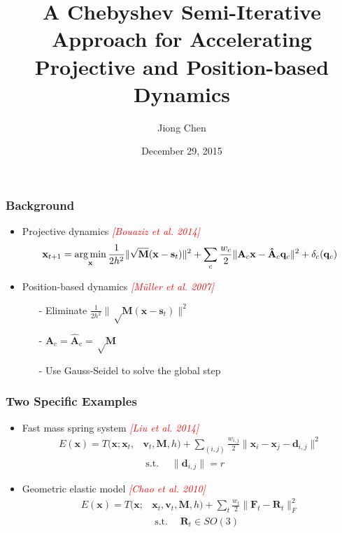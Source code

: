\documentclass[serif,mathserif]{beamer}
\author[Jiong Chen]{Jiong Chen}
\title[\hspace{2em}\insertframenumber/\inserttotalframenumber]{\huge A Chebyshev Semi-Iterative Approach for Accelerating Projective and Position-based Dynamics}
\date{December 29, 2015} %
\newcommand{\BOLD}[1]{\mathbf{#1}}
\newcommand{\TODO}[1]{\textcolor{red}{#1}}
\newcommand{\argmin}{\operatornamewithlimits{arg\min}}
\DeclareMathOperator{\ST}{s.t.}
\begin{document}
\maketitle

\begin{frame}
 \frametitle{Background}
 \begin{itemize}
  \item Projective dynamics \TODO{\textit{[Bouaziz et al. 2014]}}
  \begin{equation*}
    \BOLD{x}_{t+1}=\argmin_{\BOLD{x}} \frac{1}{2h^2}\|\sqrt\BOLD{M}(\BOLD{x}-\BOLD{s}_t)\|^2+\sum_c\frac{w_c}{2}\|\BOLD{A}_c\BOLD{x}-\BOLD{\hat A}_c\BOLD{q}_c\|^2+\delta_c(\BOLD{q}_c)
  \end{equation*}
  \item Position-based dynamics \TODO{\textit{[M\"uller et al. 2007]}}
    \begin{itemize}
     \item[-] Eliminate $\frac{1}{2h^2}\|\sqrt\BOLD{M}(\BOLD{x}-\BOLD{s}_t)\|^2$
     \item[-] $\BOLD{A}_c = \BOLD{\hat A}_c = \sqrt \BOLD{M}$
     \item[-] Use Gauss-Seidel to solve the global step
    \end{itemize}
 \end{itemize}
\end{frame}

\begin{frame}
 \frametitle{Two Specific Examples}
 \begin{itemize}
  \item Fast mass spring system \TODO{\textit{[Liu et al. 2014]}}
  \begin{equation*}
   \begin{split}
    E(\BOLD{x})=T(\BOLD{x}; \BOLD{x}_t, &\BOLD{v}_t, \BOLD{M}, h)+ \sum_{(i, j)}\frac{w_{i, j}}{2}\|\BOLD{x}_i-\BOLD{x}_j-\BOLD{d}_{i,j}\|^2 \\
    &\ST \quad \|\BOLD{d}_{i,j}\| = r
   \end{split}
  \end{equation*}
  \item Geometric elastic model \TODO{\textit{[Chao et al. 2010]}}
  \begin{equation*}
   \begin{split}
    E(\BOLD{x})=T(\BOLD{x}; &\BOLD{x}_t, \BOLD{v}_t, \BOLD{M}, h)+ \sum_{t}\frac{w_t}{2}\|\BOLD{F}_t-\BOLD{R}_t\|_F^2 \\
    &\ST \quad \BOLD{R}_t \in SO(3)
   \end{split}
  \end{equation*}
 \end{itemize}
\end{frame}
\end{document}
